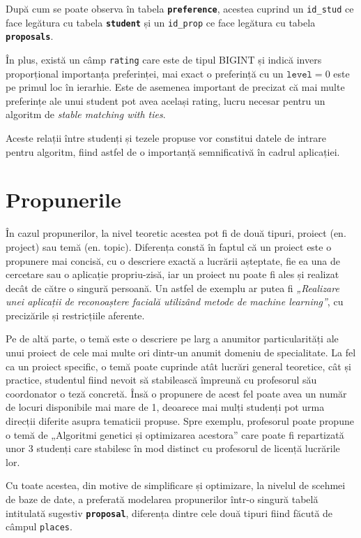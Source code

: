După cum se poate observa în tabela \textbf{\texttt{preference}}, acestea cuprind un \texttt{id\_stud} ce face legătura cu tabela \textbf{\texttt{student}} și un \texttt{id\_prop} ce face legătura cu tabela \textbf{\texttt{proposals}}.

În plus, există un câmp \texttt{rating} care este de tipul BIGINT și indică invers proporțional importanța preferinței, mai exact o preferință cu un $\texttt{level} = 0 $ este pe primul loc în ierarhie. Este de asemenea important de precizat că mai multe preferințe ale unui student pot avea același rating, lucru necesar pentru un algoritm de \textit{stable matching with ties}.

Aceste relații între studenți și tezele propuse vor constitui datele de intrare pentru algoritm, fiind astfel de o importanță semnificativă în cadrul aplicației.

\section{Propunerile}

În cazul propunerilor, la nivel teoretic acestea pot fi de două tipuri, proiect (en. project) sau temă (en. topic). Diferența constă în faptul că un proiect este o propunere mai concisă, cu o descriere exactă a lucrării așteptate, fie ea una de cercetare sau o aplicație propriu-zisă, iar un proiect nu poate fi ales și realizat decât de către o singură persoană.
Un astfel de exemplu ar putea fi \textit{„Realizare unei aplicații de reconoaștere facială utilizând metode de machine learning”}, cu precizările și restricțiile aferente.

Pe de altă parte, o temă este o descriere pe larg a anumitor particularități ale unui proiect de cele mai multe ori dintr-un anumit domeniu de specialitate. La fel ca un proiect specific, o temă poate cuprinde atât lucrări general teoretice, cât și practice, studentul fiind nevoit să stabilească împreună cu profesorul său coordonator o teză concretă. Însă o propunere de acest fel poate avea un număr de locuri disponibile mai mare de 1, deoarece mai mulți studenți pot urma direcții diferite asupra tematicii propuse. Spre exemplu, profesorul poate propune o temă de „Algoritmi genetici și optimizarea acestora” care poate fi repartizată unor 3 studenți care stabilesc în mod distinct cu profesorul de licență lucrările lor.

Cu toate acestea, din motive de simplificare și optimizare, la nivelul de scehmei de baze de date, a preferată modelarea propunerilor într-o singură tabelă intitulată sugestiv \textbf{\texttt{proposal}}, diferența dintre cele două tipuri fiind făcută de câmpul \texttt{places}. 

